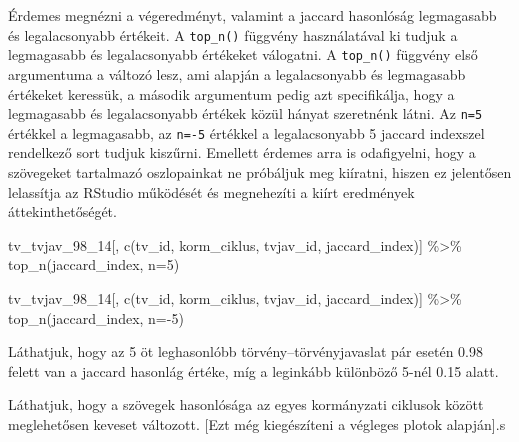 \documentclass[
]{book}
\newenvironment{Shaded}{\begin{snugshade}}{\end{snugshade}}
\newcommand{\AttributeTok}[1]{\textcolor[rgb]{0.77,0.63,0.00}{#1}}
\newcommand{\DecValTok}[1]{\textcolor[rgb]{0.00,0.00,0.81}{#1}}
\newcommand{\FunctionTok}[1]{\textcolor[rgb]{0.00,0.00,0.00}{#1}}
\newcommand{\NormalTok}[1]{#1}
\newcommand{\SpecialCharTok}[1]{\textcolor[rgb]{0.00,0.00,0.00}{#1}}
\newcommand{\StringTok}[1]{\textcolor[rgb]{0.31,0.60,0.02}{#1}}
\begin{document}
Érdemes megnézni a végeredményt, valamint a jaccard hasonlóság
legmagasabb és legalacsonyabb értékeit. A \texttt{top\_n()} függvény
használatával ki tudjuk a legmagasabb és legalacsonyabb értékeket
válogatni. A \texttt{top\_n()} függvény első argumentuma a változó lesz,
ami alapján a legalacsonyabb és legmagasabb értékeket keressük, a
második argumentum pedig azt specifikálja, hogy a legmagasabb és
legalacsonyabb értékek közül hányat szeretnénk látni. Az \texttt{n=5}
értékkel a legmagasabb, az \texttt{n=-5} értékkel a legalacsonyabb 5
jaccard indexszel rendelkező sort tudjuk kiszűrni. Emellett érdemes arra
is odafigyelni, hogy a szövegeket tartalmazó oszlopainkat ne próbáljuk
meg kiíratni, hiszen ez jelentősen lelassítja az RStudio működését és
megnehezíti a kiírt eredmények áttekinthetőségét.

\begin{Shaded}
\begin{Highlighting}[]
\NormalTok{tv\_tvjav\_98\_14[, }\FunctionTok{c}\NormalTok{(}\StringTok{\textquotesingle{}tv\_id\textquotesingle{}}\NormalTok{, }\StringTok{\textquotesingle{}korm\_ciklus\textquotesingle{}}\NormalTok{, }\StringTok{\textquotesingle{}tvjav\_id\textquotesingle{}}\NormalTok{, }\StringTok{\textquotesingle{}jaccard\_index\textquotesingle{}}\NormalTok{)] }\SpecialCharTok{\%\textgreater{}\%} 
  \FunctionTok{top\_n}\NormalTok{(jaccard\_index, }\AttributeTok{n=}\DecValTok{5}\NormalTok{) }
\end{Highlighting}
\end{Shaded}

\begin{Shaded}
\begin{Highlighting}[]
\NormalTok{tv\_tvjav\_98\_14[, }\FunctionTok{c}\NormalTok{(}\StringTok{\textquotesingle{}tv\_id\textquotesingle{}}\NormalTok{, }\StringTok{\textquotesingle{}korm\_ciklus\textquotesingle{}}\NormalTok{, }\StringTok{\textquotesingle{}tvjav\_id\textquotesingle{}}\NormalTok{, }\StringTok{\textquotesingle{}jaccard\_index\textquotesingle{}}\NormalTok{)] }\SpecialCharTok{\%\textgreater{}\%} 
  \FunctionTok{top\_n}\NormalTok{(jaccard\_index, }\AttributeTok{n=}\SpecialCharTok{{-}}\DecValTok{5}\NormalTok{) }
\end{Highlighting}
\end{Shaded}

Láthatjuk, hogy az 5 öt leghasonlóbb törvény--törvényjavaslat pár esetén
0.98 felett van a jaccard hasonlág értéke, míg a leginkább különböző
5-nél 0.15 alatt.

Láthatjuk, hogy a szövegek hasonlósága az egyes kormányzati ciklusok
között meglehetősen keveset változott. {[}Ezt még kiegészíteni a
végleges plotok alapján{]}.s
\end{document}
